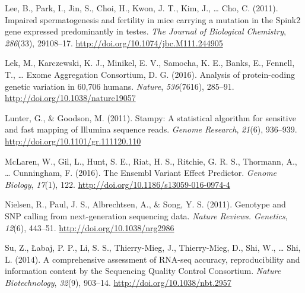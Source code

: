 \documentclass[12pt,twoside]{reedthesis}
\theoremstyle{definition}
\theoremstyle{definition}
\theoremstyle{remark}
\begin{document}
  \hypertarget{ref-Lee2011}{}
  Lee, B., Park, I., Jin, S., Choi, H., Kwon, J. T., Kim, J., \ldots{}
  Cho, C. (2011). Impaired spermatogenesis and fertility in mice carrying
  a mutation in the Spink2 gene expressed predominantly in testes.
  \emph{The Journal of Biological Chemistry}, \emph{286}(33), 29108--17.
  \url{http://doi.org/10.1074/jbc.M111.244905}
  
  \hypertarget{ref-Lek2016}{}
  Lek, M., Karczewski, K. J., Minikel, E. V., Samocha, K. E., Banks, E.,
  Fennell, T., \ldots{} Exome Aggregation Consortium, D. G. (2016).
  Analysis of protein-coding genetic variation in 60,706 humans.
  \emph{Nature}, \emph{536}(7616), 285--91.
  \url{http://doi.org/10.1038/nature19057}
  
  \hypertarget{ref-Lunter2011}{}
  Lunter, G., \& Goodson, M. (2011). Stampy: A statistical algorithm for
  sensitive and fast mapping of Illumina sequence reads. \emph{Genome
  Research}, \emph{21}(6), 936--939.
  \url{http://doi.org/10.1101/gr.111120.110}
  
  \hypertarget{ref-McLaren2016}{}
  McLaren, W., Gil, L., Hunt, S. E., Riat, H. S., Ritchie, G. R. S.,
  Thormann, A., \ldots{} Cunningham, F. (2016). The Ensembl Variant Effect
  Predictor. \emph{Genome Biology}, \emph{17}(1), 122.
  \url{http://doi.org/10.1186/s13059-016-0974-4}
  
  \hypertarget{ref-Nielsen2011}{}
  Nielsen, R., Paul, J. S., Albrechtsen, A., \& Song, Y. S. (2011).
  Genotype and SNP calling from next-generation sequencing data.
  \emph{Nature Reviews. Genetics}, \emph{12}(6), 443--51.
  \url{http://doi.org/10.1038/nrg2986}
  
  \hypertarget{ref-Su2014}{}
  Su, Z., Łabaj, P. P., Li, S. S., Thierry-Mieg, J., Thierry-Mieg, D.,
  Shi, W., \ldots{} Shi, L. (2014). A comprehensive assessment of RNA-seq
  accuracy, reproducibility and information content by the Sequencing
  Quality Control Consortium. \emph{Nature Biotechnology}, \emph{32}(9),
  903--14. \url{http://doi.org/10.1038/nbt.2957}


\end{document}
